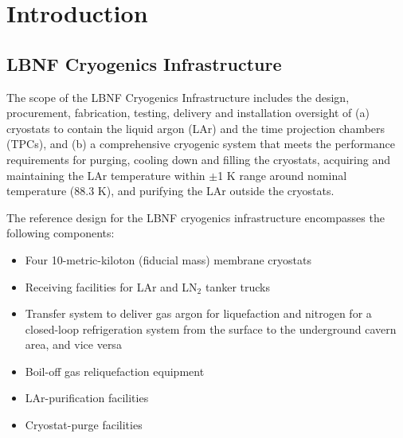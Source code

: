 \chapter{Introduction}
\label{ch:cryo-intro}

\section{LBNF Cryogenics Infrastructure}
\label{sec:cryo-intro-fd}

The scope of the LBNF Cryogenics Infrastructure includes the design, 
procurement, fabrication, testing, delivery and installation
oversight of (a) cryostats to contain the liquid argon (LAr) 
and the time projection chambers (TPCs), and (b) a comprehensive 
cryogenic system that meets the performance requirements
for purging, cooling down and filling the cryostats, acquiring and 
maintaining the LAr temperature within $\pm$1 K range around nominal 
temperature (88.3 K), and purifying the LAr outside the cryostats.


The reference design for the LBNF cryogenics infrastructure 
encompasses the following components:

\begin{itemize}
\item Four 10-metric-kiloton (fiducial mass) membrane cryostats 
\item Receiving facilities for LAr and LN$_2$ tanker trucks 
\item Transfer system to deliver gas argon for liquefaction and 
      nitrogen for a closed-loop refrigeration system from the
      surface to the underground cavern area, and vice versa
\item Boil-off gas reliquefaction equipment
\item LAr-purification facilities
\item Cryostat-purge facilities
\end{itemize}


